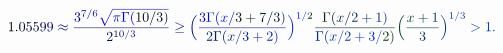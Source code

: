 \documentclass[12pt]{article}
\begin{document}
\makeatletter
\renewcommand*{\@textcolor}[3]{%
  \protect\leavevmode
  \begingroup
    \color#1{#2}#3%
  \endgroup
}
\makeatother
\begin{displaymath}
\mathcolor[RGB]{0,0,15}{1} \mathcolor[RGB]{0,0,30}{.} \mathcolor[RGB]{0,0,45}{0} \mathcolor[RGB]{0,0,60}{5} \mathcolor[RGB]{0,0,75}{5} \mathcolor[RGB]{0,0,90}{9} \mathcolor[RGB]{0,0,105}{9} \mathcolor[RGB]{0,0,120}{\approx} \mathcolor[RGB]{0,0,135}{\frac { \mathcolor[RGB]{0,0,150}{3} ^ { \mathcolor[RGB]{0,0,165}{7} \mathcolor[RGB]{0,0,180}{/} \mathcolor[RGB]{0,0,195}{6} } \mathcolor[RGB]{0,0,210}{\sqrt { \mathcolor[RGB]{0,0,225}{\pi} \mathcolor[RGB]{0,0,240}{\Gamma} \mathcolor[RGB]{0,0,255}{(} \mathcolor[RGB]{0,15,0}{1} \mathcolor[RGB]{0,15,15}{0} \mathcolor[RGB]{0,15,30}{/} \mathcolor[RGB]{0,15,45}{3} \mathcolor[RGB]{0,15,60}{)} } } } { \mathcolor[RGB]{0,15,75}{2} ^ { \mathcolor[RGB]{0,15,90}{1} \mathcolor[RGB]{0,15,105}{0} \mathcolor[RGB]{0,15,120}{/} \mathcolor[RGB]{0,15,135}{3} } } } \mathcolor[RGB]{0,15,150}{\ge} \mathcolor[RGB]{0,15,165}{\Bigl(} \mathcolor[RGB]{0,15,180}{\frac { \mathcolor[RGB]{0,15,195}{3} \mathcolor[RGB]{0,15,210}{\Gamma} \mathcolor[RGB]{0,15,225}{(} \mathcolor[RGB]{0,15,240}{x} \mathcolor[RGB]{0,15,255}{/} \mathcolor[RGB]{0,30,0}{3} \mathcolor[RGB]{0,30,15}{+} \mathcolor[RGB]{0,30,30}{7} \mathcolor[RGB]{0,30,45}{/} \mathcolor[RGB]{0,30,60}{3} \mathcolor[RGB]{0,30,75}{)} } { \mathcolor[RGB]{0,30,90}{2} \mathcolor[RGB]{0,30,105}{\Gamma} \mathcolor[RGB]{0,30,120}{(} \mathcolor[RGB]{0,30,135}{x} \mathcolor[RGB]{0,30,150}{/} \mathcolor[RGB]{0,30,165}{3} \mathcolor[RGB]{0,30,180}{+} \mathcolor[RGB]{0,30,195}{2} \mathcolor[RGB]{0,30,210}{)} } } \mathcolor[RGB]{0,30,225}{\Bigr)} ^ { \mathcolor[RGB]{0,30,240}{1} \mathcolor[RGB]{0,30,255}{/} \mathcolor[RGB]{0,45,0}{2} } \mathcolor[RGB]{0,45,15}{\frac { \mathcolor[RGB]{0,45,30}{\Gamma} \mathcolor[RGB]{0,45,45}{(} \mathcolor[RGB]{0,45,60}{x} \mathcolor[RGB]{0,45,75}{/} \mathcolor[RGB]{0,45,90}{2} \mathcolor[RGB]{0,45,105}{+} \mathcolor[RGB]{0,45,120}{1} \mathcolor[RGB]{0,45,135}{)} } { \mathcolor[RGB]{0,45,150}{\Gamma} \mathcolor[RGB]{0,45,165}{(} \mathcolor[RGB]{0,45,180}{x} \mathcolor[RGB]{0,45,195}{/} \mathcolor[RGB]{0,45,210}{2} \mathcolor[RGB]{0,45,225}{+} \mathcolor[RGB]{0,45,240}{3} \mathcolor[RGB]{0,45,255}{/} \mathcolor[RGB]{0,60,0}{2} \mathcolor[RGB]{0,60,15}{)} } } \mathcolor[RGB]{0,60,30}{\Bigl(} \mathcolor[RGB]{0,60,45}{\frac { \mathcolor[RGB]{0,60,60}{x} \mathcolor[RGB]{0,60,75}{+} \mathcolor[RGB]{0,60,90}{1} } { \mathcolor[RGB]{0,60,105}{3} } } \mathcolor[RGB]{0,60,120}{\Bigr)} ^ { \mathcolor[RGB]{0,60,135}{1} \mathcolor[RGB]{0,60,150}{/} \mathcolor[RGB]{0,60,165}{3} } \mathcolor[RGB]{0,60,180}{>} \mathcolor[RGB]{0,60,195}{1} \mathcolor[RGB]{0,60,210}{.}
\end{displaymath}
\end{document}
